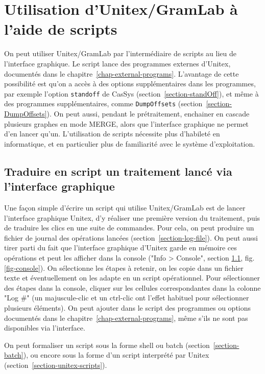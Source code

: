 \chapter{Utilisation d'Unitex/GramLab à l'aide de scripts}
\label{chap-scripts}

On peut utiliser Unitex/GramLab par l'intermédiaire de scripts au lieu de l'interface graphique.
Le script lance des programmes externes d'Unitex, documentés dans le
chapitre~\ref{chap-external-programs}. L'avantage de cette possibilité est qu'on a accès à des options
supplémentaires dans les programmes, par exemple l'option \verb$standoff$ de CasSys
(section~\ref{section-standOff}), et même à des programmes supplémentaires, comme
\verb$DumpOffsets$ (section~\ref{section-DumpOffsets}). On peut aussi, pendant le prétraitement,
enchainer en cascade plusieurs graphes en mode MERGE, alors que l'interface graphique ne permet d'en
lancer qu'un.
L'utilisation de scripts nécessite plus d'habileté en informatique, et en particulier plus de familiarité
avec le système d'exploitation.



\section{Traduire en script un traitement lancé via l'interface graphique}
\label{section-console}

Une façon simple d'écrire un script qui utilise Unitex/GramLab est de lancer l'interface graphique Unitex,
d'y réaliser une première version du traitement, puis de traduire les clics en une suite de commandes.
Pour cela, on peut produire un fichier de journal des opérations lancées (section~\ref{section-log-file}).
On peut aussi tirer parti du fait que l'interface graphique d'Unitex garde en mémoire ces opérations
et peut les afficher dans la
console ("Info > Console", section \ref{section-console}, fig. \ref{fig-console}). On sélectionne les étapes
à retenir, on les copie dans un fichier texte et éventuellement on les adapte en un script opérationnel.
Pour sélectionner des étapes dans la console, cliquer sur les cellules correspondantes dans la colonne
"Log \#" (un majuscule-clic et un ctrl-clic ont l'effet habituel pour sélectionner plusieurs éléments).
On peut ajouter dans le script des programmes ou options documentés dans le
chapitre~\ref{chap-external-programs}, même s'ils ne sont pas disponibles via l'interface.

\bigskip
\noindent On peut formaliser un script sous la forme shell ou batch (section~\ref{section-batch}),
ou encore sous la forme d'un script interprété par Unitex (section~\ref{section-unitex-scripts}).



